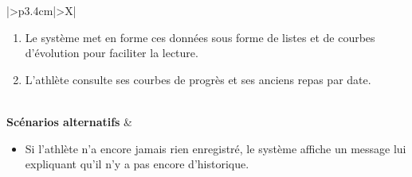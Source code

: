 \documentclass[a4paper,12pt]{report}
\begin{document}
\begin{table}[H]
\begin{tabularx}{\textwidth}{|>{\RaggedRight\arraybackslash}p{3.4cm}|>{\RaggedRight\arraybackslash}X|}
\begin{minipage}[t]{\linewidth}
\begin{enumerate}[label=\arabic*., leftmargin=*, topsep=0pt, itemsep=1pt]
\begin{itemize}[leftmargin=*, topsep=1pt, itemsep=1pt]
        \item L'évolution des mesures du corps (poids et mensurations).
    \end{itemize}
    \item Le système met en forme ces données sous forme de listes et de courbes d'évolution pour faciliter la lecture.
    \item L'athlète consulte ses courbes de progrès et ses anciens repas par date.
\end{enumerate}
\vspace{2pt}
\end{minipage} \\
\hline
\textbf{Scénarios alternatifs} &
\begin{minipage}[t]{\linewidth}
\vspace{2pt}
\begin{itemize}[leftmargin=*, topsep=0pt, itemsep=1pt]
    \item  Si l'athlète n'a encore jamais rien enregistré, le système affiche un message lui expliquant qu'il n'y a pas encore d'historique.
\end{itemize}
\vspace{2pt}
\end{minipage} \\
\hline
\end{tabularx}
\fussy
\end{table}
\end{document}
